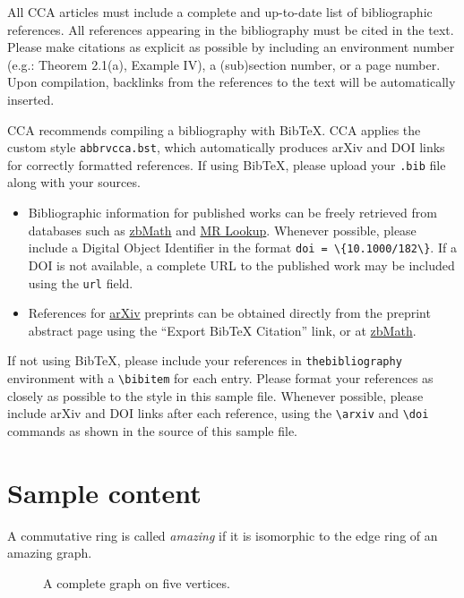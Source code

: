 \documentclass[12pt]{article}
\begin{document}
All CCA articles must include a complete and up-to-date list of
bibliographic references. All references appearing in the bibliography
must be cited in the text. Please make citations as explicit as
possible by including an environment number (e.g.: Theorem 2.1(a),
Example IV), a (sub)section number, or a page number.  Upon
compilation, backlinks from the references to the text will be
automatically inserted.

CCA recommends compiling a bibliography with BibTeX. CCA applies the
custom style \texttt{abbrvcca.bst}, which automatically produces arXiv
and DOI links for correctly formatted references. If using BibTeX,
please upload your \texttt{.bib} file along with your sources.
\begin{itemize}
\item Bibliographic information for published works can be freely
  retrieved from databases such as \href{https://zbmath.org/}{zbMath}
  and \href{https://mathscinet.ams.org/mrlookup}{MR Lookup}. Whenever
  possible, please include a Digital Object Identifier in the format
  \verb|doi = \{10.1000/182\}|. If a DOI is not available, a
  complete URL to the published work may be included using the
  \texttt{url} field.
\item References for \href{https://arxiv.org/}{arXiv} preprints can be
  obtained directly from the preprint abstract page using the ``Export
  BibTeX Citation'' link, or at \href{https://zbmath.org/}{zbMath}.
\end{itemize}
If not using BibTeX, please include your references in
\texttt{thebibliography} environment with a \verb|\bibitem| for each
entry. Please format your references as closely as possible to the
style in this sample file.  Whenever possible, please include arXiv
and DOI links after each reference, using the \verb|\arxiv| and
\verb|\doi| commands as shown in the source of this sample file.


\section{Sample content}

\begin{definition}
  A commutative ring is called \emph{amazing} if it is isomorphic to
  the edge ring of an amazing graph.
\end{definition}

\begin{figure}[htb]
  \centering
  \caption{A complete graph on five vertices.}
  \label{fig:graph}
\end{figure}
\end{document}
